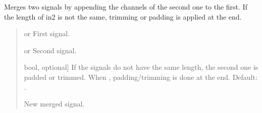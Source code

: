 \documentclass[letterpaper,10pt,english]{sphinxmanual}
\begin{document}
\begin{fulllineitems}
\label{\detokenize{modules/dsptoolbox.standard_functions:dsptoolbox.standard_functions.merge_signals}}
\pysigstartsignatures
{}
\pysigstopsignatures
\sphinxAtStartPar
Merges two signals by appending the channels of the second one to the
first. If the length of in2 is not the same, trimming or padding is
applied at the end.
\begin{quote}\begin{description}
\begin{description}
\sphinxlineitem{\sphinxstylestrong{in1}}{[} or \sphinxtitleref{MultiBandSignal}{]}
\sphinxAtStartPar
First signal.

\sphinxlineitem{\sphinxstylestrong{in2}}{[} or \sphinxtitleref{MultiBandSignal}{]}
\sphinxAtStartPar
Second signal.

\sphinxlineitem{\sphinxstylestrong{trimming\_at\_end}}{[}bool, optional{]}
\sphinxAtStartPar
If the signals do not have the same length, the second one is padded
or trimmed. When , padding/trimming is done at the end.
Default: .

\end{description}

\begin{description}
\sphinxlineitem{\sphinxstylestrong{new\_sig}}{[}\sphinxtitleref{Signal}{]}
\sphinxAtStartPar
New merged signal.

\end{description}

\end{description}\end{quote}

\end{fulllineitems}

\end{document}
